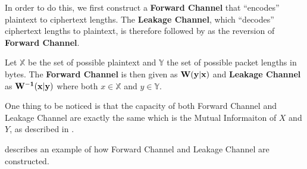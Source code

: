 In order to do this, we first construct a  \textbf{Forward Channel} that “encodes” plaintext to ciphertext lengths. The \textbf{Leakage Channel}, which “decodes” ciphertext lengths to plaintext, is therefore followed by as the reversion of \textbf{Forward Channel}.

\begin{definition} \label{Def: Channels}
Let $\mathbb{X}$ be the set of possible plaintext and $\mathbb{Y}$ the set of possible packet lengths in bytes. The \textbf{Forward Channel} is then given as  $\bf{W(y|x)}$ and \textbf{Leakage Channel} as $\bf{W^{-1}(x|y)}$ where both $x \in \mathbb{X}$ and $y \in \mathbb{Y}$.
\end{definition}

One thing to be noticed is that the capacity of both Forward Channel and Leakage Channel are exactly the same which is the Mutual Informaiton of $X$ and $Y$, as described in \cite{Web2}.

 describes an example of how Forward Channel and Leakage Channel are constructed.

